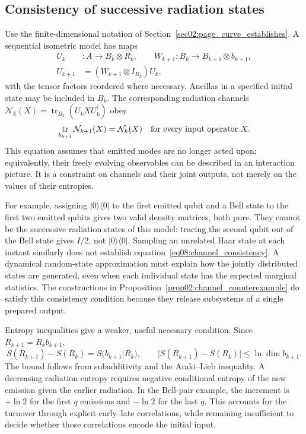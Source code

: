 \documentclass[11pt,letterpaper]{article}
\theoremstyle{plain}
\theoremstyle{definition}
\theoremstyle{remark}
\newcommand{\Ncal}{\mathcal{N}}
\DeclareMathOperator{\tr}{tr}
\begin{document}
\subsection{Consistency of successive radiation states}
\label{subsec08:nested_channels}

Use the finite-dimensional notation of
Section~\ref{sec02:page_curve_establishes}. A sequential isometric model
has maps
\begin{equation}
\begin{aligned}
 U_k&:A\longrightarrow B_k\otimes R_k,\qquad
 W_{k+1}:B_k\longrightarrow B_{k+1}\otimes b_{k+1},\\
 U_{k+1}&=(W_{k+1}\otimes I_{R_k})U_k,
\end{aligned}
 \label{eq08:sequential_isometries}
\end{equation}
with the tensor factors reordered where necessary. Ancillas in a
specified initial state may be included in $B_k$. The corresponding
radiation channels $\Ncal_k(X)=\tr_{B_k}(U_kXU_k^\dagger)$ obey
\begin{equation}
 \tr_{b_{k+1}}\Ncal_{k+1}(X)=\Ncal_k(X)
 \quad\hbox{for every input operator }X.
 \label{eq08:channel_consistency}
\end{equation}
This equation assumes that emitted modes are no longer acted upon;
equivalently, their freely evolving observables can be described in an
interaction picture. It is a constraint on channels and their joint
outputs, not merely on the values of their entropies.

For example, assigning $|0\rangle\langle0|$ to the first emitted qubit
and a Bell state to the first two emitted qubits gives two valid
density matrices, both pure. They cannot be the successive radiation
states of this model: tracing the second qubit out of the Bell state
gives $I/2$, not $|0\rangle\langle0|$. Sampling an unrelated Haar state
at each instant similarly does not establish
equation~\eqref{eq08:channel_consistency}. A dynamical random-state
approximation must explain how the jointly distributed states are
generated, even when each individual state has the expected marginal
statistics. The constructions in
Proposition~\ref{prop02:channel_counterexample} do satisfy this
consistency condition because they release subsystems of a single
prepared output.

Entropy inequalities give a weaker, useful necessary condition. Since
$R_{k+1}=R_kb_{k+1}$,
\begin{equation}
 S(R_{k+1})-S(R_k)=S(b_{k+1}|R_k),\qquad
 |S(R_{k+1})-S(R_k)|\leq\ln\dim b_{k+1}.
 \label{eq08:entropy_increment}
\end{equation}
The bound follows from subadditivity and the Araki--Lieb inequality.
A decreasing radiation entropy requires negative conditional entropy
of the new emission given the earlier radiation. In the Bell-pair
example, the increment is $+\ln2$ for the first $q$ emissions and
$-\ln2$ for the last $q$. This accounts for the turnover through
explicit early--late correlations, while remaining insufficient to
decide whether those correlations encode the initial input.
\end{document}

